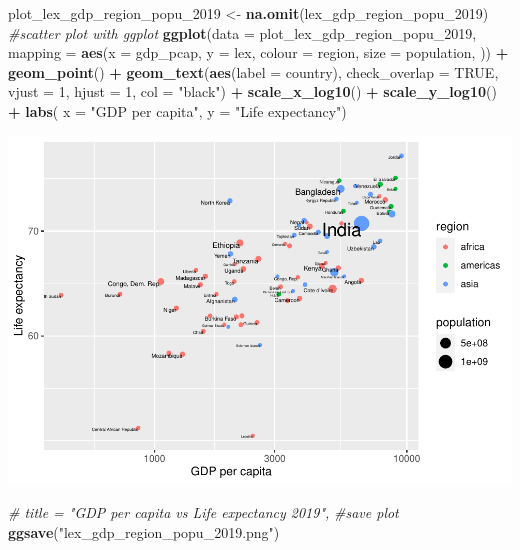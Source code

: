 \documentclass[
]{article}
\newenvironment{Shaded}{\begin{snugshade}}{\end{snugshade}}
\newcommand{\AttributeTok}[1]{\textcolor[rgb]{0.13,0.29,0.53}{#1}}
\newcommand{\CommentTok}[1]{\textcolor[rgb]{0.56,0.35,0.01}{\textit{#1}}}
\newcommand{\ConstantTok}[1]{\textcolor[rgb]{0.56,0.35,0.01}{#1}}
\newcommand{\DecValTok}[1]{\textcolor[rgb]{0.00,0.00,0.81}{#1}}
\newcommand{\FunctionTok}[1]{\textcolor[rgb]{0.13,0.29,0.53}{\textbf{#1}}}
\newcommand{\NormalTok}[1]{#1}
\newcommand{\OtherTok}[1]{\textcolor[rgb]{0.56,0.35,0.01}{#1}}
\newcommand{\SpecialCharTok}[1]{\textcolor[rgb]{0.81,0.36,0.00}{\textbf{#1}}}
\newcommand{\StringTok}[1]{\textcolor[rgb]{0.31,0.60,0.02}{#1}}
\begin{document}
\begin{Shaded}
\begin{Highlighting}[]
\NormalTok{plot\_lex\_gdp\_region\_popu\_2019 }\OtherTok{\textless{}{-}} \FunctionTok{na.omit}\NormalTok{(lex\_gdp\_region\_popu\_2019)}
\CommentTok{\#scatter plot with ggplot}
\FunctionTok{ggplot}\NormalTok{(}\AttributeTok{data =}\NormalTok{ plot\_lex\_gdp\_region\_popu\_2019, }\AttributeTok{mapping =} \FunctionTok{aes}\NormalTok{(}\AttributeTok{x =}\NormalTok{ gdp\_pcap, }\AttributeTok{y =}\NormalTok{ lex,}
             \AttributeTok{colour =}\NormalTok{ region,}
             \AttributeTok{size =}\NormalTok{ population,}
\NormalTok{             )) }\SpecialCharTok{+}
  \FunctionTok{geom\_point}\NormalTok{() }\SpecialCharTok{+}
  \FunctionTok{geom\_text}\NormalTok{(}\FunctionTok{aes}\NormalTok{(}\AttributeTok{label =}\NormalTok{ country), }\AttributeTok{check\_overlap =} \ConstantTok{TRUE}\NormalTok{, }\AttributeTok{vjust =} \DecValTok{1}\NormalTok{, }\AttributeTok{hjust =} \DecValTok{1}\NormalTok{, }\AttributeTok{col =} \StringTok{"black"}\NormalTok{) }\SpecialCharTok{+}
  \FunctionTok{scale\_x\_log10}\NormalTok{() }\SpecialCharTok{+}
  \FunctionTok{scale\_y\_log10}\NormalTok{() }\SpecialCharTok{+}
  \FunctionTok{labs}\NormalTok{(}
       \AttributeTok{x =} \StringTok{"GDP per capita"}\NormalTok{,}
       \AttributeTok{y =} \StringTok{"Life expectancy"}\NormalTok{)}
\end{Highlighting}
\end{Shaded}

\includegraphics{MTSTIN007_SC_Assingment_2_files/figure-latex/unnamed-chunk-5-1.pdf}

\begin{Shaded}
\begin{Highlighting}[]
  \CommentTok{\# title = "GDP per capita vs Life expectancy 2019",}
\CommentTok{\#save plot}
\FunctionTok{ggsave}\NormalTok{(}\StringTok{"lex\_gdp\_region\_popu\_2019.png"}\NormalTok{)}
\end{Highlighting}
\end{Shaded}
\end{document}
